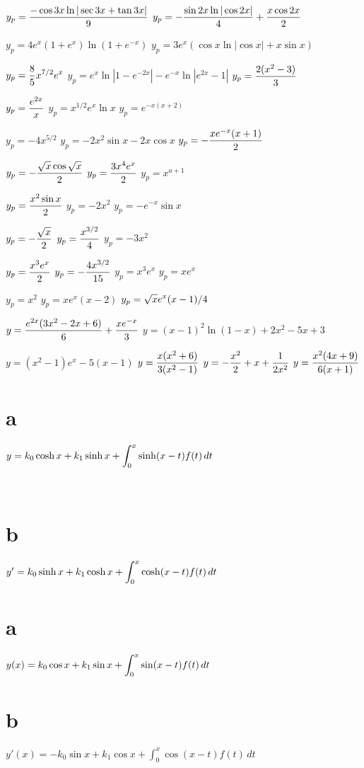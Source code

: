 \medskip

  $y_{p}=\displaystyle\frac{-\cos3x\ln|\sec3x+\tan3x|}{9}$
  $y_{p}=\displaystyle{-\frac{\sin2x\ln|\cos2x|}{4}
+\frac{x\cos2x}{2}}$

   $y_{p}=4e^{x}(1+e^{x})\ln(1+e^{-x})$
 $y_{p}=3e^{x}(\cos x\ln|\cos x|+x\sin x)$

   $y_{p}=\displaystyle\frac{8}{5}x^{7/2}e^{x}$
  $y_{p}=e^{x}\ln|1-e^{-2x}|-e^{-x}\ln|e^{2x}-1|$
 $y_{p}=\displaystyle\frac{2(x^{2}-3)}{3}$

  $y_{p}=\displaystyle\frac{e^{2x}}{x}$
 $y_{p}=x^{1/2}e^{x}\ln x$
   $y_{p}=e^{-x(x+2)}$

  $y_{p}=-4x^{5/2}$
  $y_{p}=-2x^{2}\sin x-2x\cos x$
  $y_{p}=-\displaystyle\frac{xe^{-x}(x+1)}{2}$

  $y_{p}=-\displaystyle\frac{\sqrt{x}\cos\sqrt{x}}{2}$
  $y_{p}=\displaystyle\frac{3x^{4}e^{x}}{2}$
  $y_{p}=x^{a+1}$

  $y_{p}=\displaystyle\frac{x^{2}\sin x}{2}$
 $y_{p}=-2x^{2}$
 $y_{p}=-e^{-x}\sin x$

 $y_{p}=-\displaystyle\frac{\sqrt{x}}{2}$
 $y_{p}=\displaystyle\frac{x^{3/2}}{4}$
 $y_{p}=-3x^{2}$

 $y_{p}=\displaystyle\frac{x^{3}e^{x}}{2}$
 $y_{p}=-\displaystyle\frac{4x^{3/2}}{15}$
 $y_{p}=x^{3}e^{x}$
  $y_{p}=xe^{x}$

 $y_{p}=x^{2}$
  $y_{p}=xe^{x}(x-2)$
 $y_{p}=\displaystyle{\sqrt{x}e^{x}(x-1)/4}$

$y=\displaystyle\frac{e^{2x}(3x^{2}-2x+6)}{6}+\displaystyle\frac{xe^{-x}}{3}$
 $y=(x-1)^{2}\ln(1-x)+2x^{2}-5x+3$

 $y=(x^{2}-1)e^{x}-5(x-1)$
 $y=\displaystyle\frac{x(x^{2}+6)}{3(x^{2}-1)}$
 $y=\displaystyle{-\frac{x^{2}}{2}+x+\frac{1}{2x^{2}}}$
 $y=\displaystyle\frac{x^{2}(4x+9)}{6(x+1)}$

\part{a} $y=k_{0}\cosh x+k_{1}\sinh x+\displaystyle{\int_{0}^{x}}\sinh
(x-t)f(t)\,dt$

\quad\;  \;  \,\part{b} $y'=k_{0}\sinh x+k_{1}\cosh x+\displaystyle{\int_{0}^{x}}\cosh
(x-t)f(t)\,dt$

\part{a} $y(x)=k_{0}\cos x+k_{1}\sin x+\displaystyle{\int_{0}^{x}}\sin
(x-t)f(t)\,dt$

\quad\;  \;   \part{b} $y'(x)=-k_{0}\sin x+k_{1}\cos x+\int_{0}^{x}\cos(x-t)
f(t)\,dt$

